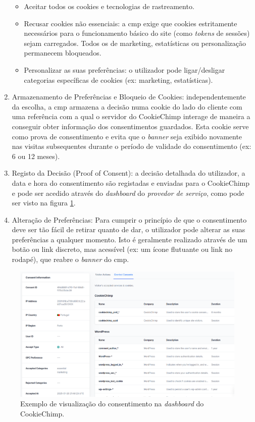 \begin{enumerate}
    \begin{itemize}
        \item Aceitar todos os cookies e tecnologias de rastreamento.
        \item Recusar cookies não essenciais: a \acrshort{cmp} exige que cookies estritamente necessários para o funcionamento básico do site (como \textit{tokens} de sessões) sejam carregados. Todos os de marketing, estatísticas ou personalização permanecem bloqueados.
        \item Personalizar as suas preferências: o utilizador pode ligar/desligar categorias específicas de cookies (ex: marketing, estatísticas).
    \end{itemize}
    \item Armazenamento de Preferências e Bloqueio de Cookies: independentemente da escolha, a \acrshort{cmp} armazena a decisão numa cookie do lado do cliente com uma referência com a qual o servidor do CookieChimp interage de maneira a conseguir obter informação dos consentimentos guardados. Esta cookie serve como prova de consentimento e evita que o \textit{banner} seja exibido novamente nas visitas subsequentes durante o período de validade do consentimento (ex: 6 ou 12 meses).
    \item Registo da Decisão (Proof of Consent): a decisão detalhada do utilizador, a data e hora do consentimento são registadas e enviadas para o CookieChimp e pode ser acedido através do \textit{dashboard} do \textit{provedor de serviço}, como pode ser visto na figura \ref{fig:dashboard-visualizacao}.
    \item Alteração de Preferências: Para cumprir o princípio de que o consentimento deve ser tão fácil de retirar quanto de dar, o utilizador pode alterar as suas preferências a qualquer momento. Isto é geralmente realizado através de um botão ou link discreto, mas acessível (ex: um ícone flutuante ou link no rodapé), que reabre o \textit{banner} do \acrshort{cmp}.
\end{enumerate}


\begin{figure}[h]
    \begin{center}
	\includegraphics[width=1.0\textwidth]{images/consent.png}
    \end{center}
    \caption{Exemplo de visualização do consentimento na \textit{dashboard} do CookieChimp.}
\label{fig:dashboard-visualizacao}
\end{figure}

